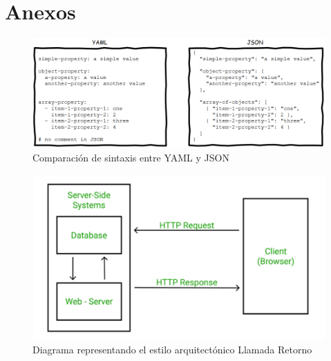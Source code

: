 \section*{Anexos}

\begin{figure}[h]
    \centering
    \includegraphics[width=\linewidth]{images/yaml-vs-json.png}
    \caption{Comparación de sintaxis entre YAML y JSON}
    \label{fig:yaml-vs-json}
\end{figure}

\begin{figure}[h]
    \centering
    \includegraphics[width=\linewidth]{images/call-return-style.png}
    \caption{Diagrama representando el estilo arquitectónico Llamada Retorno}
    \label{fig:call-return-style}
\end{figure}

